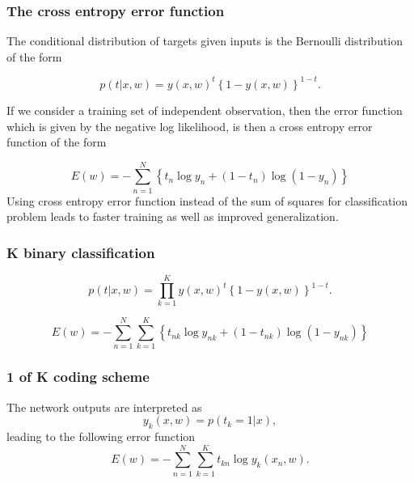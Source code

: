 \begin{frame}
  \frametitle{The cross entropy error function}
  The conditional distribution of targets given 
  inputs is the Bernoulli distribution of the form

  \begin{equation}
    p(t|x,w)
    = 
    y(x,w)^t
    \left\{
      1 - y(x,w)
    \right\}^{1-t}.
  \end{equation}

  If we consider a training set of independent observation, 
  then the error function which is given by the negative log 
  likelihood, is then a cross entropy error function of the form 

  \begin{equation}
    E(w)
    =
    - 
    \sum_{n = 1}^N
    \left\{ 
      t_n \log y_n
      +
      (1-t_n) \log(1 - y_n)
    \right\}
  \end{equation}
Using cross entropy error function instead of the sum of squares 
for classification problem leads to faster training as well as improved generalization.
\end{frame}


\begin{frame}
  \frametitle{K binary classification}

  \begin{equation}
    p(t|x,w)
    = 
    \prod_{k=1}^K
    y(x,w)^t
    \left\{
      1 - y(x,w)
    \right\}^{1-t}.
  \end{equation}

  \begin{equation}
    E(w)
    =
    - 
    \sum_{n = 1}^N
    \sum_{k = 1}^K
    \left\{ 
      t_{n k} \log y_{n k}
      +
      (1-t_{n k}) \log(1 - y_{n k})
    \right\}
  \end{equation}

\end{frame}

\begin{frame}
  \frametitle{1 of K coding scheme}
The network outputs are interpreted as
\begin{equation}
  y_k(x,w)
  = 
  p(t_k = 1 | x),
\end{equation}
leading to the following error function
  \begin{equation}
    E(w)
    = 
    - \sum_{n=1}^N
    \sum_{k=1}^K
    t_{k n}
    \log y_k(x_n, w).
  \end{equation}
\end{frame}

